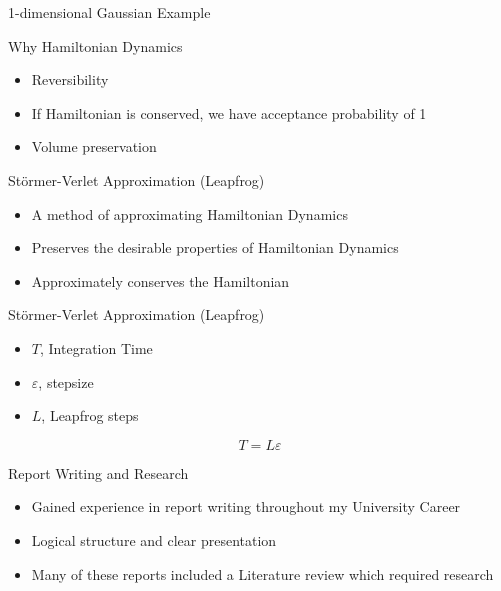\documentclass{beamer}
\begin{document}
\begin{frame}{1-dimensional Gaussian Example}
\begin{figure}
\centering
{}
\end{figure}
\end{frame}


\begin{frame}{Why Hamiltonian Dynamics}
\begin{itemize}
\item Reversibility 
\item If Hamiltonian is conserved, we have acceptance probability of 1
\item Volume preservation
\end{itemize}

\end{frame}


\begin{frame}{Störmer-Verlet Approximation (Leapfrog)}
\begin{itemize}
\item A method of approximating Hamiltonian Dynamics

\item Preserves the desirable properties of Hamiltonian Dynamics

\item Approximately conserves the Hamiltonian

\end{itemize}
\end{frame}


\begin{frame}{Störmer-Verlet Approximation (Leapfrog)}
\begin{itemize}
\item $T$, Integration Time
\item $\varepsilon$, stepsize
\item $L$, Leapfrog steps 
\end{itemize}
\begin{equation}
T = L \varepsilon 
\end{equation}
\end{frame}



\begin{frame}{Report Writing and Research}

\begin{itemize}
\item Gained experience in report writing throughout my University Career \vskip 5mm

\item Logical structure and clear presentation \vskip 5mm

\item Many of these reports included a Literature review which required research
\end{itemize}

\end{frame}
\end{document}
